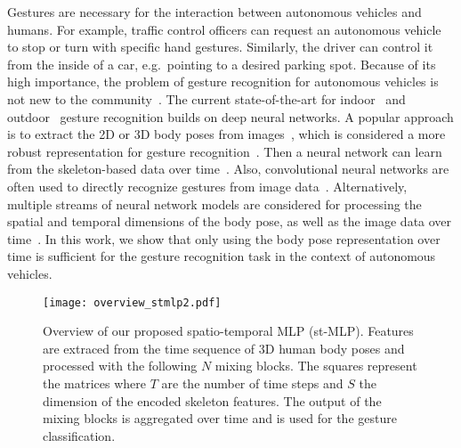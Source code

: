 \documentclass[letterpaper, 10 pt, conference]{ieeeconf}
\begin{document}
Gestures are necessary for the interaction between autonomous vehicles and humans. For example, traffic control officers can request an autonomous vehicle to stop or turn with specific hand gestures. Similarly, the driver can control it from the inside of a car, e.g.~pointing to a desired parking spot. Because of its high importance, the problem of gesture recognition for autonomous vehicles is not new to the community~\cite{Chaman2018, bergasa2006real, liang2007real}. The current state-of-the-art for indoor~\cite{drive_and_act_2019_iccv} and outdoor~\cite{wiederer2020traffic} gesture recognition builds on deep neural networks. A popular approach is to extract the 2D or 3D body poses from images~\cite{bouazizi2021learning, bouazizi2021self, belagiannis2014holistic}, which is considered a more robust representation for gesture recognition~\cite{zimek2012survey, jhuang2013towards}. Then a neural network can learn from the skeleton-based data over time~\cite{wiederer2020traffic,yan2018spatial}. Also, convolutional neural networks are often used to directly recognize gestures from image data~\cite{carreira2017quo,qiu2017learning}. Alternatively, multiple streams of neural network models are considered for processing the spatial and temporal dimensions of the body pose, as well as the image data over time~\cite{martin2018body}. In this work, we show that only using the body pose representation over time is sufficient for the gesture recognition task in the context of autonomous vehicles.

\begin{figure}[!ht]
\vspace{2mm}
    \centering
    \texttt{[image: overview\_stmlp2.pdf]}
    \caption{Overview of our proposed spatio-temporal MLP (st-MLP). Features are extraced from the time sequence of 3D human body poses and processed with the following $N$ mixing blocks. The squares represent the matrices where $T$ are the number of time steps and $S$ the dimension of the encoded skeleton features. The output of the mixing blocks is aggregated over time and is used for the gesture classification.}
    \label{fig:overview_stmlp}
\end{figure}
\end{document}
